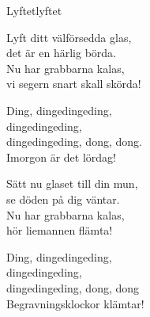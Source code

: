 \begin{song}{Lyftet}{lyftet}
\begin{vers}
Lyft ditt välförsedda glas,\\
det är en härlig börda.\\
Nu har grabbarna kalas,\\
vi segern snart skall skörda!\\
\end{vers}
\begin{vers}
\repopen Ding, dingedingeding,\\
dingedingeding,\\
dingedingeding, dong, dong.\\
Imorgon är det lördag! \repclose\\
\end{vers}
\begin{vers}
Sätt nu glaset till din mun,\\
se döden på dig väntar.\\
Nu har grabbarna kalas,\\
hör liemannen flämta!\\
\end{vers}
\begin{vers}
\repopen Ding, dingedingeding,\\
dingedingeding,\\
dingedingeding, dong, dong\\
Begravningsklockor klämtar! \repclose\\
\end{vers}
\end{song}
